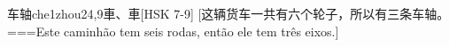 \begin{EntryWithPhonetic}{车轴}{che1zhou2}{4,9}{⾞、⾞}[HSK 7-9]
  [这辆货车一共有六个轮子，所以有三条车轴。===Este caminhão tem seis rodas, então ele tem três eixos.]
\end{EntryWithPhonetic}
